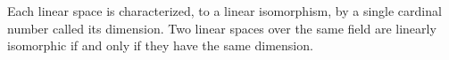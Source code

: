 Each linear space is characterized, to a linear isomorphism, by a single cardinal number called its dimension. Two linear spaces over the same field are linearly isomorphic if and only if they have the same dimension.
